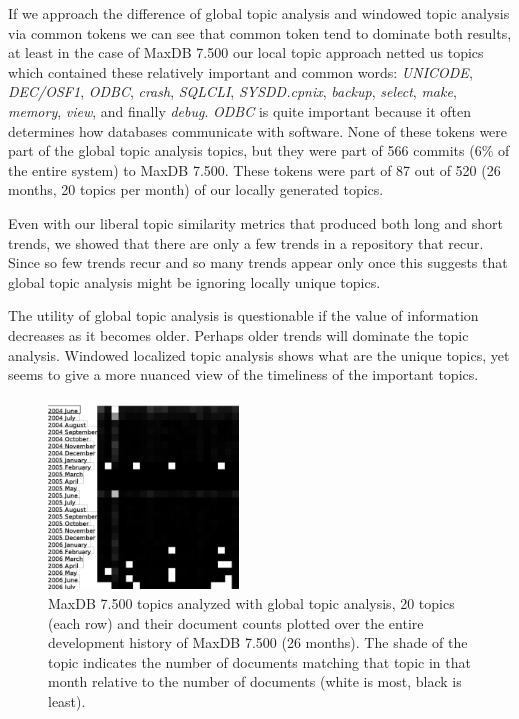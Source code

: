 \documentclass[times, 10pt,twocolumn]{article}
\begin{document}

If we approach the difference of global topic analysis and windowed
topic analysis via common tokens we can see that common token tend to
dominate both results, at least in the case of MaxDB 7.500 our local
topic approach netted us topics which contained these relatively
important and common words: \emph{UNICODE}, \emph{DEC/OSF1},
\emph{ODBC}, \emph{crash}, \emph{SQLCLI}, \emph{SYSDD.cpnix},
\emph{backup}, \emph{select}, \emph{make}, \emph{memory}, \emph{view},
and finally \emph{debug}. \emph{ODBC} is quite important because it
often determines how databases communicate with software. None of
these tokens were part of the global topic analysis topics, but they
were part of 566 commits (6\% of the entire system) to MaxDB
7.500. These tokens were part of 87 out of 520 (26 months, 20 topics
per month) of our locally generated topics.


Even with our liberal topic similarity metrics that produced both long
and short trends, we showed that there are only a few trends in a
repository that recur. Since so few trends recur and so many trends
appear only once this suggests that global topic analysis might be
ignoring locally unique topics.



The utility of global topic analysis is questionable if the value of
information decreases as it becomes older. Perhaps older trends will
dominate the topic analysis. Windowed localized topic analysis shows
what are the unique topics, yet seems to give a more nuanced view of
the timeliness of the important topics.





\begin{figure}[t]
  \centering
  \includegraphics[width=0.45\textwidth]{month}
  \caption{MaxDB 7.500 topics analyzed with global topic analysis, 20
    topics (each row) and their document counts plotted over the
    entire development history of MaxDB 7.500 (26 months). The shade
    of the topic indicates the number of documents matching that topic
    in that month relative to the number of documents (white is most,
    black is least).}
  \label{fig:statictopics}
\end{figure}
\end{document}
